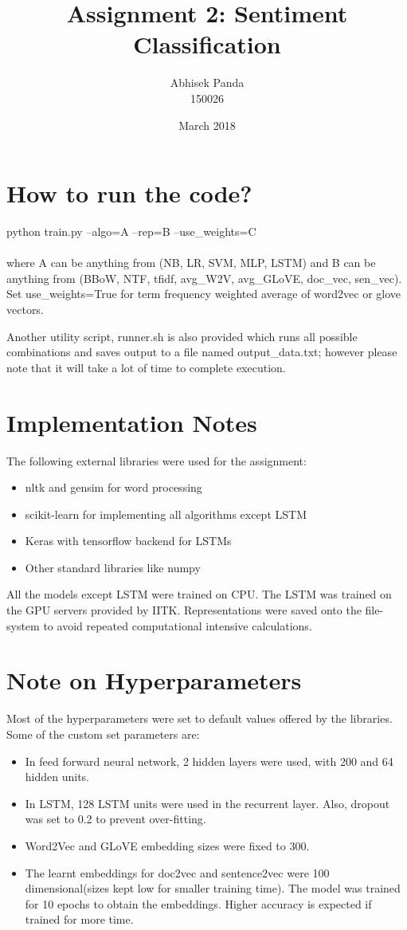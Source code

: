 \documentclass{article}
\title{Assignment 2: Sentiment Classification}
\author{Abhisek Panda\\ 150026}
\date{March 2018}
\begin{document}
\maketitle
\section{How to run the code?}
python train.py --algo=A --rep=B --use\_weights=C\\\\
where A can be anything from (NB, LR, SVM, MLP, LSTM) and B can be anything from (BBoW, NTF, tfidf, avg\_W2V, avg\_GLoVE, doc\_vec, sen\_vec). Set use\_weights=True for term frequency weighted average of word2vec or glove vectors.

Another utility script, runner.sh is also provided which runs all possible combinations and saves output to a file named output\_data.txt; however please note that it will take a lot of time to complete execution.
\section{Implementation Notes}
The following external libraries were used for the assignment:
\begin{itemize}
	\item nltk and gensim for word processing
	\item scikit-learn for implementing all algorithms except LSTM
	\item Keras with tensorflow backend for LSTMs
	\item Other standard libraries like numpy
\end{itemize}
All the models except LSTM were trained on CPU. The LSTM was trained on the GPU servers provided by IITK. Representations were saved onto the file-system to avoid repeated computational intensive calculations.
\section{Note on Hyperparameters}
Most of the hyperparameters were set to default values offered by the libraries. Some of the custom set parameters are:
\begin{itemize}
	\item In feed forward neural network, 2 hidden layers were used, with 200 and 64 hidden units.
	\item In LSTM, 128 LSTM units were used in the recurrent layer. Also, dropout was set to 0.2 to prevent over-fitting.
	\item Word2Vec and GLoVE embedding sizes were fixed to 300.
	\item The learnt embeddings for doc2vec and sentence2vec were 100 dimensional(sizes kept low for smaller training time). The model was trained for 10 epochs to obtain the embeddings. Higher accuracy is expected if trained for more time.
\end{itemize}
\end{document}
